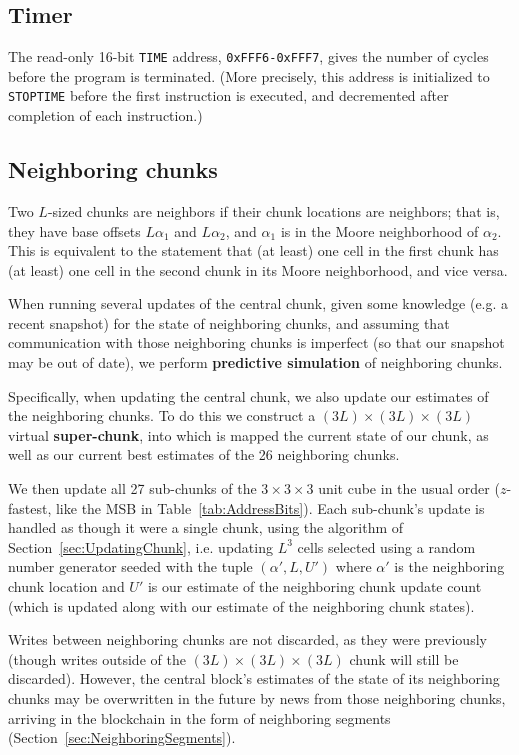 \documentclass{article}
\newcommand\code[1]{{\tt #1}}
\newcommand\hex[1]{{\tt 0x#1}}
\newcommand\hexrange[2]{\hex{#1}{\tt -}\hex{#2}}
\begin{document}
\subsection{Timer}

The read-only 16-bit \code{TIME} address, \hexrange{FFF6}{FFF7}, gives the number of cycles before the program is terminated.
(More precisely, this address is initialized to \code{STOPTIME} before the first instruction is executed,
and decremented after completion of each instruction.)

\subsection{Neighboring chunks}
\label{sec:NeighborChunks}

Two $L$-sized chunks are neighbors if their chunk locations are neighbors;
that is, they have base offsets $L\alpha_1$ and $L\alpha_2$,
and $\alpha_1$ is in the Moore neighborhood of $\alpha_2$.
This is equivalent to the statement that (at least) one cell in the first chunk has (at least) one cell in the second chunk in its Moore neighborhood, and vice versa.

When running several updates of the central chunk,
given some knowledge (e.g. a recent snapshot) for the state of neighboring chunks,
and assuming that communication with those neighboring chunks is imperfect (so that our snapshot may be out of date),
we perform {\bf predictive simulation} of neighboring chunks.

Specifically, when updating the central chunk, we also update our estimates of the neighboring chunks.
To do this we construct a $(3L) \times (3L) \times (3L)$ virtual {\bf super-chunk},
into which is mapped the current state of our chunk, as well as our current best estimates of the 26 neighboring chunks.

We then update all 27 sub-chunks of the $3 \times 3 \times 3$ unit cube in the usual order ($z$-fastest, like the MSB in Table~\ref{tab:AddressBits}).
Each sub-chunk's update is handled as though it were a single chunk,
using the algorithm of Section~\ref{sec:UpdatingChunk},
i.e. updating $L^3$ cells selected using a random number generator seeded with the tuple $(\alpha',L,U')$
where $\alpha'$ is the neighboring chunk location and $U'$ is our estimate of the neighboring chunk update count
(which is updated along with our estimate of the neighboring chunk states).

Writes between neighboring chunks are not discarded, as they were previously
(though writes outside of the $(3L) \times (3L) \times (3L)$ chunk will still be discarded).
However, the central block's estimates of the state of its neighboring chunks
may be overwritten in the future by news from those neighboring chunks,
arriving in the blockchain in the form of neighboring segments (Section~\ref{sec:NeighboringSegments}).
\end{document}
